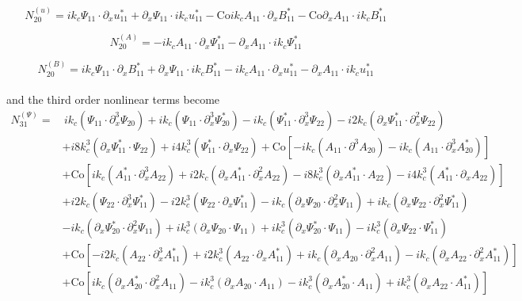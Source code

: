 \documentclass[twocolumn]{aastex61}
\newcommand{\beq}{\begin{equation}}
\newcommand{\eeq}{\end{equation}}
\newcommand{\Co}{\mathrm{Co}}
\begin{document}
\beq
N_{20}^{(u)} = i k_c \Psi_{11} \cdot \partial_x u_{11}^* + \partial_x \Psi_{11} \cdot i k_c u_{11}^* - \Co i k_c A_{11} \cdot \partial_x B_{11}^* - \Co \partial_x A_{11} \cdot i k_c B_{11}^*
\eeq

\beq
N_{20}^{(A)} = - i k_c A_{11} \cdot \partial_x \Psi_{11}^* - \partial_x A_{11} \cdot i k_c \Psi_{11}^*
\eeq

\beq
N_{20}^{(B)} = i k_c \Psi_{11} \cdot \partial_x B_{11}^* + \partial_x \Psi_{11} \cdot i k_c B_{11}^* - i k_c A_{11} \cdot \partial_x u_{11}^* - \partial_x A_{11} \cdot i k_c u_{11}^*
\eeq \\

and the third order nonlinear terms become \\

\beq
\begin{split}
N_{31}^{(\Psi)} = &  \, i k_c \left(\Psi_{11} \cdot \partial_x^3 \Psi_{20}\right) + i k_c \left(\Psi_{11} \cdot \partial_x^3\Psi_{20}^*\right) - i k_c \left(\Psi_{11}^* \cdot \partial_x^3 \Psi_{22}\right) - i 2 k_c \left(\partial_x \Psi_{11}^* \cdot \partial_x^2 \Psi_{22}\right) \\
& + i 8 k_c^3 \left(\partial_x\Psi_{11}^* \cdot \Psi_{22}\right) + i 4 k_c^3 \left(\Psi_{11}^* \cdot \partial_x \Psi_{22}\right) + \Co \left[ - i k_c \left(A_{11} \cdot \partial^3 A_{20}\right) - i k_c \left(A_{11} \cdot \partial_x^3 A_{20}^*\right) \right]\\
& + \Co \left[i k_c \left(A_{11}^* \cdot \partial_x^3 A_{22}\right) + i 2 k_c \left(\partial_x A_{11}^* \cdot \partial_x^2 A_{22}\right) - i 8 k_c^3 \left(\partial_x A_{11}^* \cdot A_{22}\right) - i 4 k_c^3 \left(A_{11}^* \cdot \partial_x A_{22}\right)\right] \\
& + i 2 k_c \left(\Psi_{22} \cdot \partial_x^3 \Psi_{11}^*\right) - i 2 k_c^3\left(\Psi_{22} \cdot \partial_x \Psi_{11}^* \right) - i k_c \left(\partial_x \Psi_{20} \cdot \partial_x^2 \Psi_{11}\right) + i k_c \left(\partial_x \Psi_{22} \cdot \partial_x^2 \Psi_{11}^*\right) \\
& - i k_c \left(\partial_x \Psi_{20}^* \cdot \partial_x^2 \Psi_{11}\right) + i k_c^3 \left(\partial_x \Psi_{20} \cdot \Psi_{11}\right) + i k_c^3 \left(\partial_x \Psi_{20}^* \cdot \Psi_{11}\right) - i k_c^3 \left(\partial_x \Psi_{22} \cdot \Psi_{11}^*\right) \\
& + \Co \left[ - i 2 k_c \left(A_{22} \cdot \partial_x^3 A_{11}^*\right) + i 2 k_c^3 \left(A_{22} \cdot \partial_x A_{11}^*\right) + i k_c \left(\partial_x A_{20} \cdot \partial_x^2 A_{11}\right) - i k_c \left(\partial_x A_{22} \cdot \partial_x^2 A_{11}^*\right) \right] \\
& + \Co \left[ i k_c \left(\partial_x A_{20}^* \cdot \partial_x^2 A_{11}\right) - i k_c^3 \left(\partial_x A_{20} \cdot A_{11}\right) - i k_c^3 \left(\partial_x A_{20}^* \cdot A_{11}\right) + i k_c^3 \left(\partial_x A_{22} \cdot A_{11}^*\right)\right]
\end{split}
\eeq
\end{document}
